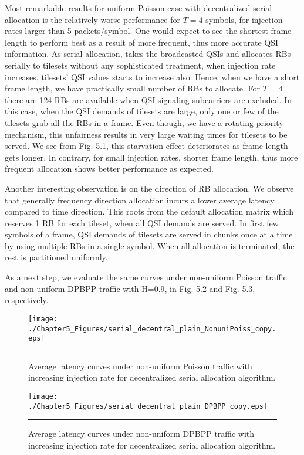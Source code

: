 Most remarkable results for uniform Poisson case with decentralized serial allocation is the relatively worse performance for $T=4$ symbols, for injection rates larger than 5 packets/symbol. One would expect to see the shortest frame length to perform best as a result of more frequent, thus more accurate QSI information. As serial allocation, takes the broadcasted QSIs and allocates RBs serially to tilesets without any sophisticated treatment, when injection rate increases, tilesets' QSI values starts to increase also. Hence, when we have a short frame length, we have practically small number of RBs to allocate. For $T=4$ there are 124 RBs are available when QSI signaling subcarriers are excluded. In this case, when the QSI demands of tilesets are large, only one or few of the tilesets grab all the RBs in a frame. Even though, we have a rotating priority mechanism, this unfairness results in very large waiting times for tilesets to be served. We see from Fig. 5.1, this starvation effect deteriorates as frame length gets longer. In contrary, for small injection rates, shorter frame length, thus more frequent allocation shows better performance as expected. 


Another interesting observation is on the direction of RB allocation. We observe that generally frequency direction allocation incurs a lower average latency compared to time direction. This roots from the default allocation matrix which reserves 1 RB for each tileset, when all QSI demands are served. In first few symbols of a frame, QSI demands of tilesets are served in chunks once at a time by using multiple RBs in a single symbol. When all allocation is terminated, the rest is partitioned uniformly.


As a next step, we evaluate the same curves under non-uniform Poisson traffic and non-uniform DPBPP traffic with H=0.9, in Fig. 5.2 and Fig. 5.3, respectively. 



\begin{figure}[htbp]
  \centering
    \texttt{[image: ./Chapter5\_Figures/serial\_decentral\_plain\_NonuniPoiss\_copy.eps]}
    \rule{35em}{0.5pt}
  \caption[Decentralized Serial Allocation Average latency under non-uniform Poisson]{Average latency curves under non-uniform Poisson traffic with increasing injection rate for decentralized serial allocation algorithm.}
  \label{fig:Electron}
\end{figure}


\begin{figure}[htbp]
  \centering
    \texttt{[image: ./Chapter5\_Figures/serial\_decentral\_plain\_DPBPP\_copy.eps]}
    \rule{35em}{0.5pt}
  \caption[Decentralized Serial Allocation Average latency under non-uniform DPBPP]{Average latency curves under non-uniform DPBPP traffic with increasing injection rate for decentralized serial allocation algorithm.}
  \label{fig:Electron}
\end{figure}

